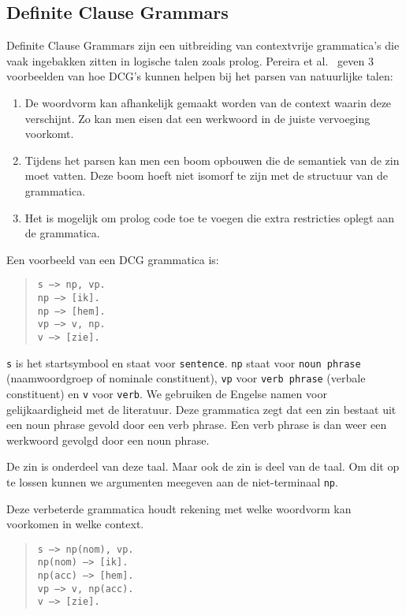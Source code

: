 \subsection{Definite Clause Grammars}
\label{sec:DCG}
Definite Clause Grammars \cite{Pereira1980} zijn een uitbreiding van contextvrije grammatica's die vaak ingebakken zitten in logische talen zoals prolog. Pereira et al.\ \cite{Pereira1980} geven 3 voorbeelden van hoe DCG's kunnen helpen bij het parsen van natuurlijke talen:

\begin{enumerate}
  \item De woordvorm kan afhankelijk gemaakt worden van de context waarin deze verschijnt. Zo kan men eisen dat een werkwoord in de juiste vervoeging voorkomt.
  \item Tijdens het parsen kan men een boom opbouwen die de semantiek van de zin moet vatten. Deze boom hoeft niet isomorf te zijn met de structuur van de grammatica.
  \item Het is mogelijk om prolog code toe te voegen die extra restricties oplegt aan de grammatica.
\end{enumerate}

\begin{ex}
  Een voorbeeld van een DCG grammatica is:
  \begin{quote}
    \texttt{s ---> np, vp.} \\
    \texttt{np ---> [ik].} \\
    \texttt{np ---> [hem].} \\
    \texttt{vp ---> v, np.} \\
    \texttt{v ---> [zie].}
  \end{quote}
\end{ex} 
\texttt{s} is het startsymbool en staat voor \texttt{sentence}. \texttt{np} staat voor \texttt{noun phrase} (naamwoordgroep of nominale constituent), \texttt{vp} voor \texttt{verb phrase} (verbale constituent) en \texttt{v} voor \texttt{verb}. We gebruiken de Engelse namen voor gelijkaardigheid met de literatuur. Deze grammatica zegt dat een zin bestaat uit een noun phrase gevold door een verb phrase. Een verb phrase is dan weer een werkwoord gevolgd door een noun phrase.

De zin  is onderdeel van deze taal. Maar ook de zin  is deel van de taal. Om dit op te lossen kunnen we argumenten meegeven aan de niet-terminaal \texttt{np}.

\begin{ex}
  \label{ex:nom-acc-features}
  Deze verbeterde grammatica houdt rekening met welke woordvorm kan voorkomen in welke context.
  \begin{quote}
    \texttt{s ---> np(nom), vp.} \\
    \texttt{np(nom) ---> [ik].} \\
    \texttt{np(acc) ---> [hem].} \\
    \texttt{vp ---> v, np(acc).} \\
    \texttt{v ---> [zie].} \\
  \end{quote}
\end{ex} 

